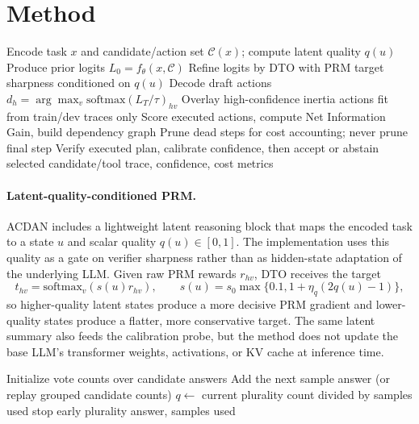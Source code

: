 \documentclass[letterpaper]{article} %
\begin{document}
\section{Method}
\begin{algorithm}[t]
\caption{ACDAN Inference}
\label{alg:acdan}
\begin{algorithmic}[1]
\STATE Encode task $x$ and candidate/action set $\mathcal{C}(x)$; compute latent quality $q(u)$
\STATE Produce prior logits $L_0=f_\theta(x,\mathcal{C})$
\STATE Refine logits by DTO with PRM target sharpness conditioned on $q(u)$
\STATE Decode draft actions $d_h=\arg\max_v \mathrm{softmax}(L_T/\tau)_{hv}$
\STATE Overlay high-confidence inertia actions fit from train/dev traces only
\STATE Score executed actions, compute Net Information Gain, build dependency graph
\STATE Prune dead steps for cost accounting; never prune final step
\STATE Verify executed plan, calibrate confidence, then accept or abstain
\RETURN selected candidate/tool trace, confidence, cost metrics
\end{algorithmic}
\end{algorithm}

\paragraph{Latent-quality-conditioned PRM.}
ACDAN includes a lightweight latent reasoning block that maps the encoded task to
a state $u$ and scalar quality $q(u)\in[0,1]$. The implementation uses this
quality as a gate on verifier sharpness rather than as hidden-state adaptation of
the underlying LLM. Given raw PRM rewards $r_{hv}$, DTO receives the target
\begin{equation}
t_{hv}=\mathrm{softmax}_v\left(s(u) r_{hv}\right),\qquad
s(u)=s_0\max\{0.1,1+\eta_q(2q(u)-1)\},
\end{equation}
so higher-quality latent states produce a more decisive PRM gradient and
lower-quality states produce a flatter, more conservative target. The same latent
summary also feeds the calibration probe, but the method does not update the
base LLM's transformer weights, activations, or KV cache at inference time.

\begin{algorithm}[t]
\caption{Adaptive Self-Consistency Baseline}
\label{alg:asc}
\begin{algorithmic}[1]
\STATE Initialize vote counts over candidate answers
  \STATE Add the next sample answer (or replay grouped candidate counts)
  \STATE $q \leftarrow$ current plurality count divided by samples used
    \STATE stop early
  \ENDIF
\ENDFOR
\RETURN plurality answer, samples used
\end{algorithmic}
\end{algorithm}
\end{document}
